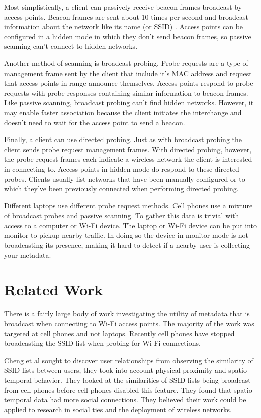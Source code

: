 \documentclass[letterpaper,twocolumn,10pt]{article}
\begin{document}
Most simplistically, a client can passively receive beacon frames broadcast by access points. Beacon frames are sent about 10 times per second and broadcast information about the network like its name (or SSID) \cite{cisco}. Access points can be configured in a hidden mode in which they don't send beacon frames, so passive scanning can't connect to hidden networks.

Another method of scanning is broadcast probing. Probe requests are a type of management frame sent by the client that include it's MAC address and request that access points in range announce themselves. Access points respond to probe requests with probe responses containing similar information to beacon frames. Like passive scanning, broadcast probing can't find hidden networks. However, it may enable faster association because the client initiates the interchange and doesn't need to wait for the access point to send a beacon.

Finally, a client can use directed probing. Just as with broadcast probing the client sends probe request management frames. With directed probing, however, the probe request frames each indicate a wireless network the client is interested in connecting to. Access points in hidden mode do respond to these directed probes. Clients usually list networks that have been manually configured or to which they've been previously connected when performing directed probing.

Different laptops use different probe request methods. Cell phones use a mixture of broadcast probes and passive scanning. To gather this data is trivial with access to a computer or Wi-Fi device. The laptop or Wi-Fi device can be put into monitor to pickup nearby traffic. In doing so the device in monitor mode is not broadcasting its presence, making it hard to detect if a nearby user is collecting your metadata.

\section{Related Work}
There is a fairly large body of work investigating the utility of metadata that is broadcast when connecting to Wi-Fi access points. The majority of the work was targeted at cell phones and not laptops. Recently cell phones have stopped broadcasting the SSID list when probing for Wi-Fi connections.

Cheng et al \cite{cheng} sought to discover user relationships from observing the similarity of SSID lists between users, they took into account physical proximity and spatio-temporal behavior. They looked at the similarities of SSID lists being broadcast from cell phones before cell phones disabled this feature. They found that spatio-temporal data had more social connections. They believed their work could be applied to research in social ties and the deployment of wireless networks.
\end{document}
